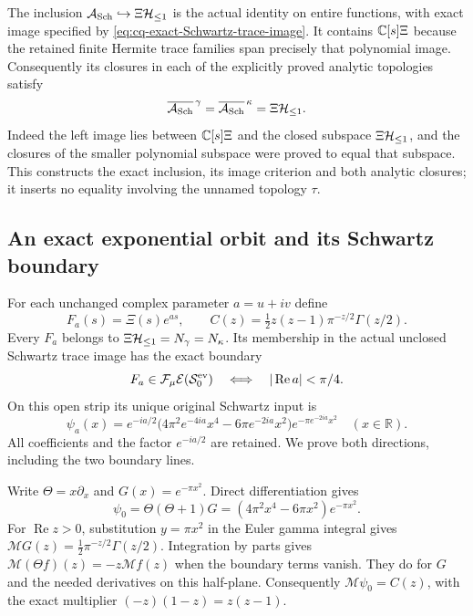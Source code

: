 The inclusion $\mathcal A_{\rm Sch}\hookrightarrow\Xi\mathcal H_{\leq 1}$
is the actual identity on entire functions, with exact image
specified by \eqref{eq:cq-exact-Schwartz-trace-image}. It contains
$\mathbb C[s]\Xi$ because the retained finite Hermite trace families
span precisely that polynomial image. Consequently its closures
in each of the explicitly proved analytic topologies satisfy
\begin{equation}\label{eq:cq-Schwartz-image-analytic-closures}
 \overline{\mathcal A_{\rm Sch}}^{\,\gamma}
 =\overline{\mathcal A_{\rm Sch}}^{\,\kappa}
 =\Xi\mathcal H_{\leq 1}.
\end{equation}
Indeed the left image lies between $\mathbb C[s]\Xi$ and the
closed subspace $\Xi\mathcal H_{\leq 1}$, and the closures of the smaller
polynomial subspace were proved to equal that subspace.
This constructs the exact inclusion, its image criterion and both
analytic closures; it inserts no equality involving the unnamed
topology $\tau$.

\subsection{An exact exponential orbit and its Schwartz boundary}
\label{sec:cq-exponential-trace}
For each unchanged complex parameter $a=u+iv$ define
\[
 F_a(s)=\Xi(s)e^{as},\qquad
 C(z)=\tfrac12 z(z-1)\pi^{-z/2}\Gamma(z/2).
\]
Every $F_a$ belongs to $\Xi\mathcal H_{\leq 1}=N_\gamma=N_\kappa$.
Its membership in the actual unclosed Schwartz trace image has
the exact boundary
\begin{equation}\label{eq:cq-exponential-Schwartz-domain}
 F_a\in\mathcal F_\mu\mathcal E(\mathcal S_0^{\rm ev})
 \quad\Longleftrightarrow\quad |\operatorname{Re}a|<\pi/4.
\end{equation}
On this open strip its unique original Schwartz input is
\begin{equation}\label{eq:cq-exponential-Schwartz-input}
 \psi_a(x)=e^{-ia/2}
   \bigl(4\pi^2e^{-4ia}x^4-6\pi e^{-2ia}x^2\bigr)
                    e^{-\pi e^{-2ia}x^2}\quad(x\in\mathbb R).
\end{equation}
All coefficients and the factor $e^{-ia/2}$ are retained.
We prove both directions, including the two boundary lines.

Write $\Theta=x\partial_x$ and $G(x)=e^{-\pi x^2}$. Direct
differentiation gives
\[
 \psi_0=\Theta(\Theta+1)G
       =(4\pi^2x^4-6\pi x^2)e^{-\pi x^2}.
\]
For $\operatorname{Re}z>0$, substitution $y=\pi x^2$ in the
Euler gamma integral gives
$\mathcal M G(z)=\frac12\pi^{-z/2}\Gamma(z/2)$.
Integration by parts gives
$\mathcal M(\Theta f)(z)=-z\mathcal M f(z)$ when the boundary
terms vanish. They do for $G$ and the needed derivatives on
this half-plane. Consequently $\mathcal M\psi_0=C(z)$, with
the exact multiplier $(-z)(1-z)=z(z-1)$.

